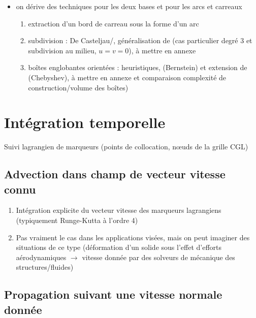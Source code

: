 \begin{enumerate}
\begin{itemize}
		\item on dérive des techniques pour les deux bases et pour les arcs et carreaux
		\begin{enumerate}
			\item extraction d'un bord de carreau sous la forme d'un arc
			\item subdivision : De Casteljau/, généralisation de \cite{fournier1994} (cas particulier degré 3 et subdivision au milieu, \ie $u = v = 0$), à mettre en annexe
			\item boîtes englobantes orientées : heuristiques, \cite{munkberg2010} (Bernstein) et extension de \cite{campagna1997} (Chebyshev), à mettre en annexe et comparaison complexité de construction/volume des boîtes)
		\end{enumerate}
	\end{itemize}
\end{enumerate}




\section{Intégration temporelle}
Suivi lagrangien de marqueurs (points de collocation, n\oe uds de la grille CGL)

\subsection{Advection dans champ de vecteur vitesse connu}
\begin{enumerate}
	\item Intégration explicite du vecteur vitesse des marqueurs lagrangiens (typiquement Runge-Kutta à l'ordre 4)
	\item Pas vraiment le cas dans les applications visées, mais on peut imaginer des situations de ce type (\eg déformation d'un solide sous l'effet d'efforts aérodynamiques $\to$ vitesse donnée par des solveurs de mécanique des structures/fluides)
\end{enumerate}



\subsection{Propagation suivant une vitesse normale donnée}

